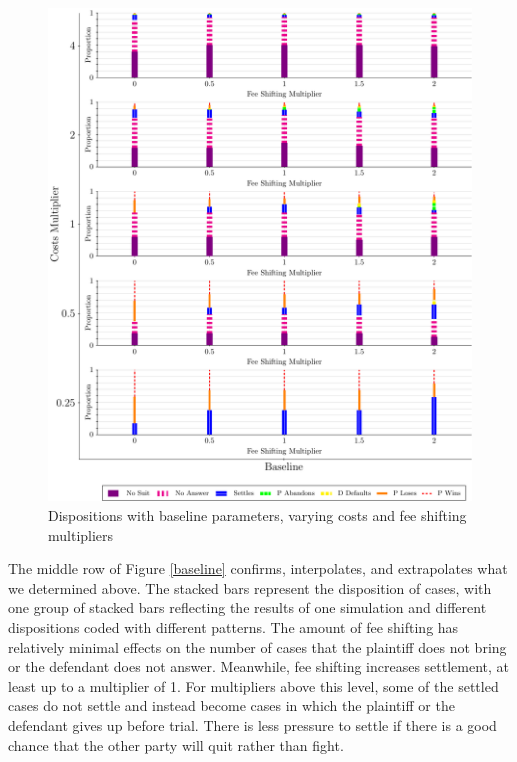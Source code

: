 \documentclass{article}
\begin{document}
\begin{figure}[h!]
\centering
\includegraphics[scale=0.50, trim={0in 0in 0in 0in}, clip]{../Figures/Disposition Baseline.pdf}
\caption{Dispositions with baseline parameters, varying costs and fee shifting multipliers}
\label{fig:disposition_baseline}
\end{figure}

The middle row of Figure \ref{baseline} confirms, interpolates, and extrapolates what we determined above. The stacked bars represent the disposition of cases, with one group of stacked bars reflecting the results of one simulation and different dispositions coded with different patterns. The amount of fee shifting has relatively minimal effects on the number of cases that the plaintiff does not bring or the defendant does not answer. Meanwhile, fee shifting increases settlement, at least up to a multiplier of 1. For multipliers above this level, some of the settled cases do not settle and instead become cases in which the plaintiff or the defendant gives up before trial. There is less pressure to settle if there is a good chance that the other party will quit rather than fight. 
\end{document}
